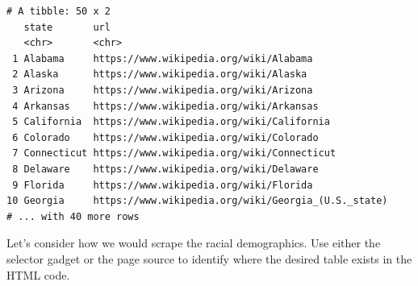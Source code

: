 \documentclass[
]{article}
\newenvironment{Shaded}{\begin{snugshade}}{\end{snugshade}}
\newcommand{\DataTypeTok}[1]{\textcolor[rgb]{0.13,0.29,0.53}{#1}}
\newcommand{\KeywordTok}[1]{\textcolor[rgb]{0.13,0.29,0.53}{\textbf{#1}}}
\newcommand{\NormalTok}[1]{#1}
\newcommand{\OperatorTok}[1]{\textcolor[rgb]{0.81,0.36,0.00}{\textbf{#1}}}
\newcommand{\StringTok}[1]{\textcolor[rgb]{0.31,0.60,0.02}{#1}}
\begin{document}
\begin{Shaded}
\end{Shaded}

\begin{verbatim}
# A tibble: 50 x 2
   state       url                                                
   <chr>       <chr>                                              
 1 Alabama     https://www.wikipedia.org/wiki/Alabama             
 2 Alaska      https://www.wikipedia.org/wiki/Alaska              
 3 Arizona     https://www.wikipedia.org/wiki/Arizona             
 4 Arkansas    https://www.wikipedia.org/wiki/Arkansas            
 5 California  https://www.wikipedia.org/wiki/California          
 6 Colorado    https://www.wikipedia.org/wiki/Colorado            
 7 Connecticut https://www.wikipedia.org/wiki/Connecticut         
 8 Delaware    https://www.wikipedia.org/wiki/Delaware            
 9 Florida     https://www.wikipedia.org/wiki/Florida             
10 Georgia     https://www.wikipedia.org/wiki/Georgia_(U.S._state)
# ... with 40 more rows
\end{verbatim}

Let's consider how we would scrape the racial demographics. Use either the selector gadget or the page source to identify where the desired table exists in the HTML code.
\end{document}
